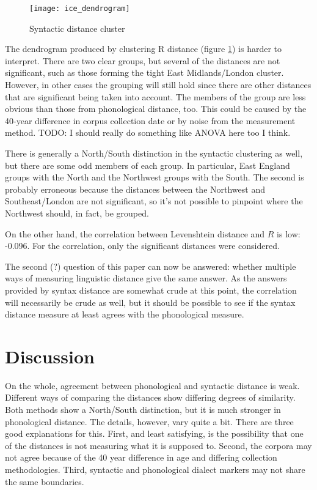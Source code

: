 \documentclass[11pt]{article}
\begin{document}
\begin{figure}
  \texttt{[image: ice\_dendrogram]}
\caption{Syntactic distance cluster}
\label{syntax-dendrogram}
\end{figure}

The dendrogram produced by clustering R distance (figure
\ref{syntax-dendrogram}) is harder to
interpret. There are two clear groups, but several of the distances
are not significant, such as those forming the tight East
Midlands/London cluster. However, in other cases the grouping will still hold
since there are other distances that are significant being taken into
account. The members of the group are less obvious than those from
phonological distance, too. This could be caused by the 40-year
difference in corpus collection date or by noise from the measurement
method.
TODO: I should really do something like ANOVA here too I think.

There is generally a North/South distinction in the syntactic
clustering as well, but there are some odd members of each group. In
particular, East England groups with the North and the Northwest
groups with the South. The second is probably erroneous because the
distances between the Northwest and Southeast/London are not
significant, so it's not possible to pinpoint where the Northwest
should, in fact, be grouped.

On the other hand, the correlation between Levenshtein distance and
$R$ is low: -0.096. For the correlation, only the significant
distances were considered.

The second (?) question of this paper can now be answered: whether
multiple ways of measuring linguistic distance give the same
answer. As the answers provided by syntax distance are somewhat crude
at this point, the correlation will necessarily be crude as well, but
it should be possible to see if the syntax distance measure at least
agrees with the phonological measure.


\section{Discussion}

On the whole, agreement between phonological and syntactic distance is
weak. Different ways of comparing the distances show differing degrees
of similarity. Both methods show a North/South distinction, but it is
much stronger in phonological distance. The details, however, vary
quite a bit. There are three good explanations for this. First, and
least satisfying, is the possibility that one of the distances is not
measuring what it is supposed to. Second, the corpora may not agree
because of the 40 year difference in age and differing collection
methodologies. Third, syntactic and phonological dialect markers may
not share the same boundaries.
\end{document}
